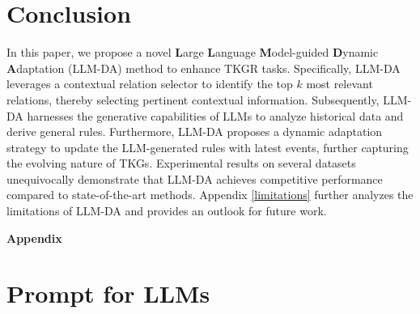 \documentclass{article}
\begin{document}
\section{Conclusion}

In this paper, we propose a novel \textbf{L}arge \textbf{L}anguage \textbf{M}odel-guided \textbf{D}ynamic \textbf{A}daptation (LLM-DA) method to enhance TKGR tasks. Specifically, LLM-DA leverages a contextual relation selector to identify the top $k$ most relevant relations, thereby selecting pertinent contextual information. Subsequently, LLM-DA harnesses the generative capabilities of LLMs to analyze historical data and derive general rules. Furthermore, LLM-DA proposes a dynamic adaptation strategy to update the LLM-generated rules with latest events, further capturing the evolving nature of TKGs.
Experimental results on several datasets unequivocally demonstrate that LLM-DA achieves competitive performance compared to state-of-the-art methods. Appendix \ref{limitations} further analyzes the limitations of LLM-DA and provides an outlook for future work.






\bigskip
\appendix

\clearpage
{\large\textbf{Appendix}}

\section{Prompt for LLMs}
\end{document}
